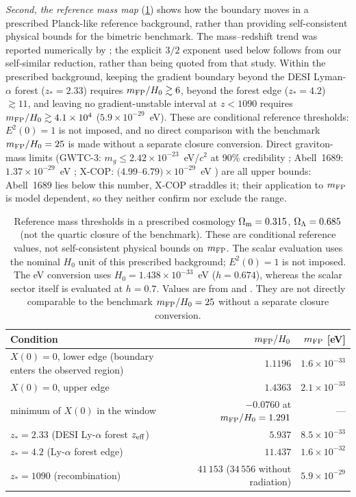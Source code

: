 \emph{Second, the reference mass map} (\cref{tab:mass}) shows how the boundary moves in a prescribed Planck-like reference background, rather than providing self-consistent physical bounds for the bimetric benchmark. The mass--redshift trend was reported numerically by \citet[][Sec.~6.3]{Hogas2022}; the explicit $3/2$ exponent used below follows from our self-similar reduction, rather than being quoted from that study. Within the prescribed background, keeping the gradient boundary beyond the DESI Lyman-$\alpha$ forest ($z_*=2.33$) requires $m_{\mathrm{FP}}/H_0\gtrsim6$, beyond the forest edge ($z_*=4.2$) $\gtrsim11$, and leaving no gradient-unstable interval at $z<1090$ requires $m_{\mathrm{FP}}/H_0\gtrsim4.1\times10^4$ ($5.9\times10^{-29}$~eV). These are conditional reference thresholds: $E^2(0)=1$ is not imposed, and no direct comparison with the benchmark $m_{\mathrm{FP}}/H_0=25$ is made without a separate closure conversion. Direct graviton-mass limits (GWTC-3: $m_g\le2.42\times10^{-23}$~eV/$c^2$ at 90\% credibility \citep{GWTC3Tests}; Abell~1689: $1.37\times10^{-29}$~eV \citep{Desai2018}; X-COP: $(4.99$--$6.79)\times10^{-29}$~eV \citep{Piorkowska2022}) are all upper bounds: Abell~1689 lies below this number, X-COP straddles it; their application to $m_{\mathrm{FP}}$ is model dependent, so they neither confirm nor exclude the range.

\begin{table}[t]
\centering\small
\caption{Reference mass thresholds in a prescribed cosmology $\Omega_{\mathrm m}=0.315$, $\Omega_{\Lambda}=0.685$ (not the quartic closure of the benchmark). These are conditional reference values, not self-consistent physical bounds on $m_{\rm FP}$. The scalar evaluation uses the nominal $H_0$ unit of this prescribed background; $E^2(0)=1$ is not imposed. The eV conversion uses $H_0=1.438\times10^{-33}$~eV ($h=0.674$), whereas the scalar sector itself is evaluated at $h=0.7$. Values are from  and . They are not directly comparable to the benchmark $m_{\mathrm{FP}}/H_0=25$ without a separate closure conversion.}\label{tab:mass}
\begin{tabularx}{\textwidth}{@{}Xrr@{}}
\toprule
Condition & $m_{\mathrm{FP}}/H_0$ & $m_{\mathrm{FP}}$ [eV]\\
\midrule
$X(0)=0$, lower edge (boundary enters the observed region) & $1.1196$ & $1.6\times10^{-33}$\\
$X(0)=0$, upper edge & $1.4363$ & $2.1\times10^{-33}$\\
minimum of $X(0)$ in the window & $-0.0760$ at $m_{\mathrm{FP}}/H_0=1.291$ & ---\\
$z_*=2.33$ (DESI Ly-$\alpha$ forest $z_{\rm eff}$) & $5.937$ & $8.5\times10^{-33}$\\
$z_*=4.2$ (Ly-$\alpha$ forest edge) & $11.437$ & $1.6\times10^{-32}$\\
$z_*=1090$ (recombination) & $41\,153$ ($34\,556$ without radiation) & $5.9\times10^{-29}$\\
\bottomrule
\end{tabularx}
\end{table}

